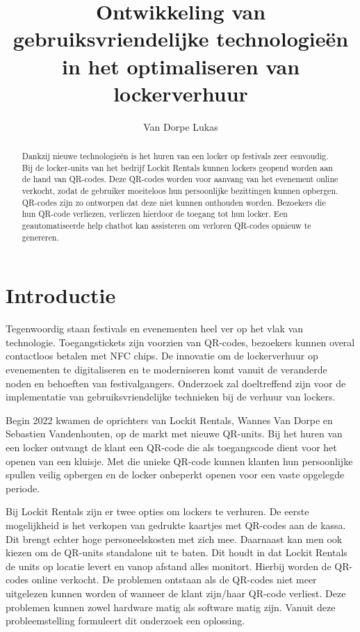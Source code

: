 \documentclass{hogent-article}
\title{Ontwikkeling van gebruiksvriendelijke technologieën in het optimaliseren van lockerverhuur}
\author{Van Dorpe Lukas}
\begin{document}
\begin{abstract}
  Dankzij nieuwe technologieën is het huren van een locker op festivals zeer eenvoudig. Bij de locker-units van het bedrijf Lockit Rentals kunnen lockers geopend worden aan de hand van QR-codes. Deze QR-codes worden voor aanvang van het evenement online verkocht, zodat de gebruiker moeiteloos hun persoonlijke bezittingen kunnen opbergen. QR-codes zijn zo ontworpen dat deze niet kunnen onthouden worden.
  Bezoekers die hun QR-code verliezen, verliezen hierdoor de toegang tot hun locker. Een geautomatiseerde help chatbot kan assisteren om verloren QR-codes opnieuw te genereren.
 
\end{abstract}

\tableofcontents

% 


\section{Introductie}%
\label{sec:introductie}



Tegenwoordig staan festivals en evenementen heel ver op het vlak van technologie. Toegangstickets zijn voorzien van QR-codes, bezoekers kunnen overal contactloos betalen met NFC chips. De innovatie om de lockerverhuur op evenementen te digitaliseren en te moderniseren komt vanuit de veranderde noden en behoeften van festivalgangers. Onderzoek zal doeltreffend zijn voor de implementatie van gebruiksvriendelijke technieken bij de verhuur van lockers.

Begin 2022 kwamen de oprichters van Lockit Rentals, Wannes Van Dorpe en Sebastien Vandenhouten, op de markt met nieuwe QR-units. Bij het huren van een locker ontvangt de klant een QR-code die als toegangscode dient voor het openen van een kluisje. Met die unieke QR-code kunnen klanten hun persoonlijke spullen veilig opbergen en de locker onbeperkt openen voor een vaste opgelegde periode. 

Bij Lockit Rentals zijn er twee opties om lockers te verhuren. De eerste mogelijkheid is het verkopen van gedrukte kaartjes met QR-codes aan de kassa. Dit brengt echter hoge personeelskosten met zich mee. Daarnaast kan men ook kiezen om de QR-units standalone uit te baten. Dit houdt in dat Lockit Rentals de units op locatie levert en vanop afstand alles monitort. Hierbij worden de QR-codes online verkocht. De problemen ontstaan als de QR-codes niet meer uitgelezen kunnen worden of wanneer de klant zijn/haar QR-code verliest. Deze problemen kunnen zowel hardware matig als software matig zijn. Vanuit deze probleemstelling formuleert dit onderzoek een oplossing.  
\end{document}
